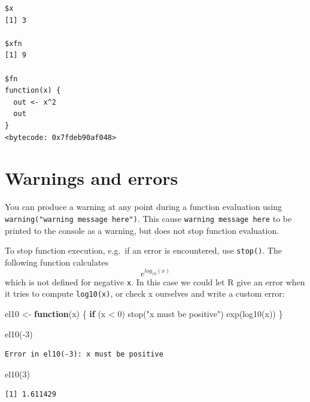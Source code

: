 \documentclass[
]{book}
\newenvironment{Shaded}{\begin{snugshade}}{\end{snugshade}}
\newcommand{\ControlFlowTok}[1]{\textcolor[rgb]{0.13,0.29,0.53}{\textbf{#1}}}
\newcommand{\DecValTok}[1]{\textcolor[rgb]{0.00,0.00,0.81}{#1}}
\newcommand{\FunctionTok}[1]{\textcolor[rgb]{0.00,0.00,0.00}{#1}}
\newcommand{\NormalTok}[1]{#1}
\newcommand{\OtherTok}[1]{\textcolor[rgb]{0.56,0.35,0.01}{#1}}
\newcommand{\SpecialCharTok}[1]{\textcolor[rgb]{0.00,0.00,0.00}{#1}}
\newcommand{\StringTok}[1]{\textcolor[rgb]{0.31,0.60,0.02}{#1}}
\begin{document}
\begin{verbatim}
$x
[1] 3

$xfn
[1] 9

$fn
function(x) {
  out <- x^2
  out
}
<bytecode: 0x7fdeb90af048>
\end{verbatim}

\hypertarget{warnings-and-errors}{%
\section{Warnings and errors}\label{warnings-and-errors}}

You can produce a warning at any point during a function evaluation using \texttt{warning("warning\ message\ here")}. This cause \texttt{warning\ message\ here} to be printed to the console as a warning, but does not stop function evaluation.

To stop function execution, e.g.~if an error is encountered, use \texttt{stop()}. The following function calculates
\[ e^{log_{10}(x)} \]
which is not defined for negative \texttt{x}. In this case we could let R give an error when it tries to compute \texttt{log10(x)}, or check x ourselves and write a custom error:

\begin{Shaded}
\begin{Highlighting}[]
\NormalTok{el10 }\OtherTok{\textless{}{-}} \ControlFlowTok{function}\NormalTok{(x) \{}
  \ControlFlowTok{if}\NormalTok{ (x }\SpecialCharTok{\textless{}} \DecValTok{0}\NormalTok{) }\FunctionTok{stop}\NormalTok{(}\StringTok{"x must be positive"}\NormalTok{)}
  \FunctionTok{exp}\NormalTok{(}\FunctionTok{log10}\NormalTok{(x))}
\NormalTok{\}}

\FunctionTok{el10}\NormalTok{(}\SpecialCharTok{{-}}\DecValTok{3}\NormalTok{)}
\end{Highlighting}
\end{Shaded}

\begin{verbatim}
Error in el10(-3): x must be positive
\end{verbatim}

\begin{Shaded}
\begin{Highlighting}[]
\FunctionTok{el10}\NormalTok{(}\DecValTok{3}\NormalTok{)}
\end{Highlighting}
\end{Shaded}

\begin{verbatim}
[1] 1.611429
\end{verbatim}
\end{document}

